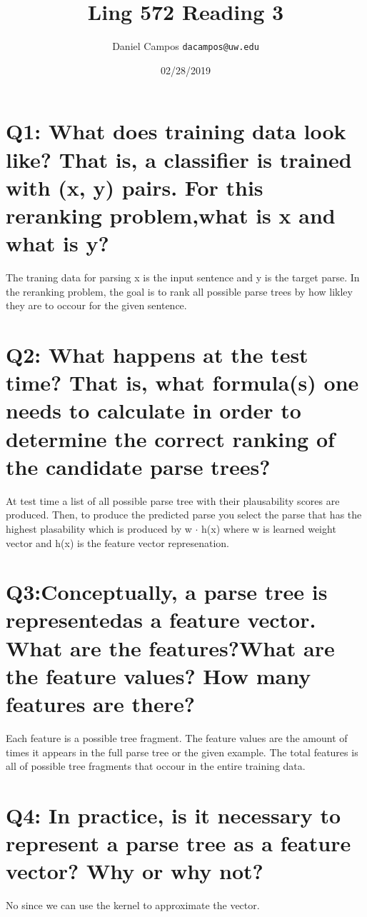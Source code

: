 \documentclass[11pt]{article}
\begin{document}
\title{Ling 572 Reading 3}
\author{Daniel Campos  \tt {dacampos@uw.edu}}
\date{02/28/2019}
\maketitle 
\section{ Q1: What does training data look like? That is, a classifier is trained with (x, y) pairs. For this reranking problem,what is x and what is y?   }
The traning data for parsing x is the input sentence and y is the target parse. In the reranking problem, the goal is to rank all possible parse trees by how likley they are to occour for the given sentence.
\section{ Q2: What happens at the test time? That is, what formula(s) one needs to calculate in order to determine the correct ranking of the candidate parse trees?}
At test time a list of all possible parse tree with their plausability scores are produced. Then, to produce the predicted parse you select the parse that has the highest plasability which is produced by w $\cdot$ h(x) where w is learned weight vector and h(x) is the feature vector represenation.
\section{ Q3:Conceptually, a parse tree is representedas a feature vector. What are the features?What are the feature values? How many features are there?}
Each feature is a possible tree fragment. The feature values are the amount of times it appears in the full parse tree or the given example. The total features is all of possible tree fragments that occour in the entire training data.
\section{Q4: In practice, is it necessary to represent a parse tree as a feature vector? Why or why not?}
No since we can use the kernel to approximate the vector. 
\end{document}
